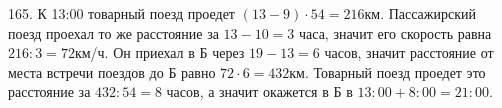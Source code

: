 165. К 13:00 товарный поезд проедет $(13-9)\cdot54=216$км. Пассажирский поезд проехал то же расстояние за $13-10=3$ часа, значит его скорость равна $216:3=72$км/ч. Он приехал в Б через $19-13=6$ часов, значит расстояние от места встречи поездов до Б равно $72\cdot6=432$км. Товарный поезд проедет это расстояние за $432:54=8$ часов, а значит окажется в Б в $13:00+8:00=21:00.$\\
